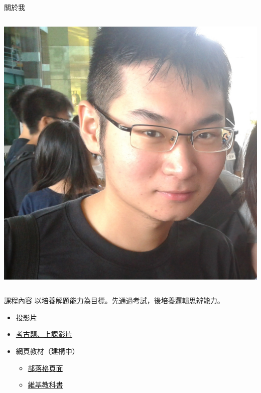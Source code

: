 \begin{frame}{關於我}
\begin{columns}[onlytextwidth]
        \begin{column}{0.4\textwidth}
            \begin{flushleft}
                \newlength{\stickerwidth}
                \setlength{\stickerwidth}{\columnwidth - 1em}
                \includegraphics[width=\stickerwidth]{Introduction/sticker.jpg}
            \end{flushleft}
        \end{column}
    \end{columns}
\end{frame}

\begin{frame}{課程內容}
    以培養解題能力為目標。先通過考試，後培養邏輯思辨能力。

    \begin{itemize}
        \item \href{https://jdh8.github.io/calculus-slides/}{投影片}
        \item \href{http://jdh8.org/category/calculus-course/}{考古題、上課影片}
        \item 網頁教材（建構中）
            \begin{itemize}
                \item \href{http://jdh8.org/calculus/}{部落格頁面}
                \item \href{https://zh.wikibooks.org/wiki/\%E5\%BE\%AE\%E7\%A7\%AF\%E5\%88\%86\%E5\%AD\%A6}{維基教科書}
            \end{itemize}
    \end{itemize}
\end{frame}

